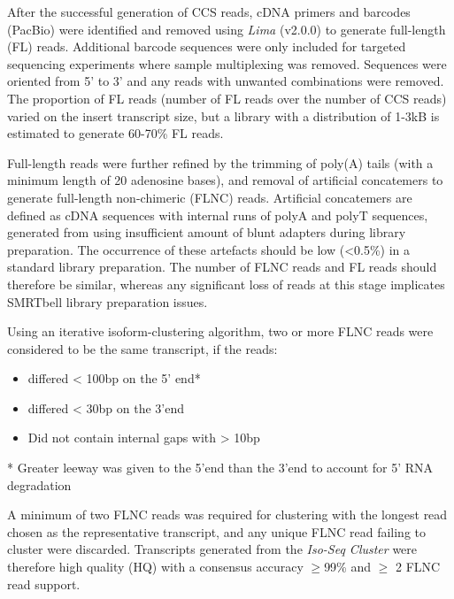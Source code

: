 After the successful generation of CCS reads, cDNA primers and barcodes (PacBio) were identified and removed using \textit{Lima} (v2.0.0) to generate full-length (FL) reads. Additional barcode sequences were only included for targeted sequencing experiments where sample multiplexing was removed. Sequences were oriented from 5’ to 3’ and any reads with unwanted combinations were removed. The proportion of FL reads (number of FL reads over the number of CCS reads) varied on the insert transcript size, but a library with a distribution of 1-3kB is estimated to generate 60-70\% FL reads.  

Full-length reads were further refined by the trimming of poly(A) tails (with a minimum length of 20 adenosine bases), and removal of artificial concatemers to generate full-length non-chimeric (FLNC) reads. Artificial concatemers are defined as cDNA sequences with internal runs of polyA and polyT sequences, generated from using insufficient amount of blunt adapters during library preparation. The occurrence of these artefacts should be low (<0.5\%) in a standard library preparation. The number of FLNC reads and FL reads should therefore be similar, whereas any significant loss of reads at this stage implicates SMRTbell library preparation issues.

Using an iterative isoform-clustering algorithm, two or more FLNC reads were considered to be the same transcript, if the reads: 
\begin{itemize}
	\item differed < 100bp on the 5’ end* 
	\item differed < 30bp on the 3’end 
	\item Did not contain internal gaps with > 10bp
\end{itemize}
* Greater leeway was given to the 5'end than the 3'end to account for 5' RNA degradation

A minimum of two FLNC reads was required for clustering with the longest read chosen as the representative transcript, and any unique FLNC read failing to cluster were discarded. Transcripts generated from the \textit{Iso-Seq Cluster} were therefore high quality (HQ) with a consensus accuracy $\geq$99\% and $\geq$ 2 FLNC read support. 


